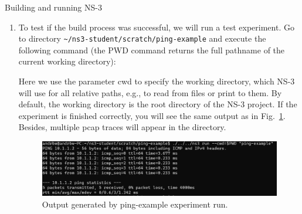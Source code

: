 \begin{exercise}{Building and running NS-3}
\begin{enumerate}
	\item To test if the build process was successful, we will run a test experiment. Go to directory \nolinkurl{~/ns3-student/scratch/ping-example} and execute the following command (the PWD command returns the full pathname of the current working directory):
	\begin{cmdblock}[gobble=2]
	\end{cmdblock}
	Here we use the parameter cwd to specify the working directory, which NS-3 will use for all relative paths, e.g., to read from files or print to them. By default, the working directory is the root directory of the NS-3 project. If the experiment is finished correctly, you will see the same output as in Fig.~\ref{fig:lab7-ping-testrun}. Besides, multiple pcap traces will appear in the directory.
	\begin{figure}[ht]
		\centering
		\includegraphics[width=0.8\linewidth]{graphics/ping-testrun}	
		\caption{Output generated by ping-example experiment run.}
		\label{fig:lab7-ping-testrun}
	\end{figure}
\end{enumerate}

\end{exercise}

